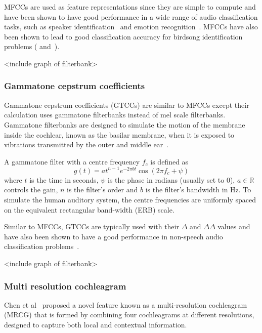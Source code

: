 MFCCs are used as feature representations since they are simple to compute and
have been shown to have good performance in a wide range of audio classification
tasks, such as speaker identification~\cite{muda2010voice} and emotion
recognition~\cite{likitha2017speech}. MFCCs have also been shown to lead to good
classification accuracy for birdsong identification problems
(\cite{fagerlund2007bird} and~\cite{ramashini2022robust}).

<include graph of filterbank>

\subsubsection{Gammatone cepstrum coefficients}

Gammatone cepstrum coefficients (GTCCs) are similar to MFCCs except their
calculation  uses gammatone filterbanks instead of mel scale filterbanks.
Gammatone filterbanks are designed to simulate the motion of the membrane inside
the cochlear, known as the basilar membrane, when it is exposed to vibrations
transmitted by the outer and middle ear~\cite{patterson1992complex}.

A gammatone filter with a centre frequency $f_c$ is defined as
\begin{equation}
  g(t) = at^{n-1}e^{-2\pi b t} \cos(2\pi f_c + \psi)
\end{equation}
where $t$ is the time in seconds, $\psi$ is the phase in radians (usually set to
0), $a \in \mathbb{R}$ controls the gain, $n$ is the filter's order and $b$ is
the filter's bandwidth in Hz. To simulate the human auditory system, the centre
frequencies are uniformly spaced on the equivalent rectangular band-width (ERB)
scale.

Similar to MFCCs, GTCCs are typically used with their $\Delta$ and $\Delta\Delta$
values and have also been shown to have a good performance in
non-speech audio classification problems~\cite{valero2012gammatone}.

<include graph of filterbank>

\subsubsection{Multi resolution cochleagram}

Chen et al~\cite{chen2014feature} proposed a novel feature known as a
multi-resolution cochleagram (MRCG) that is formed by combining four
cochleagrams at different resolutions, designed to capture both local and
contextual information.

